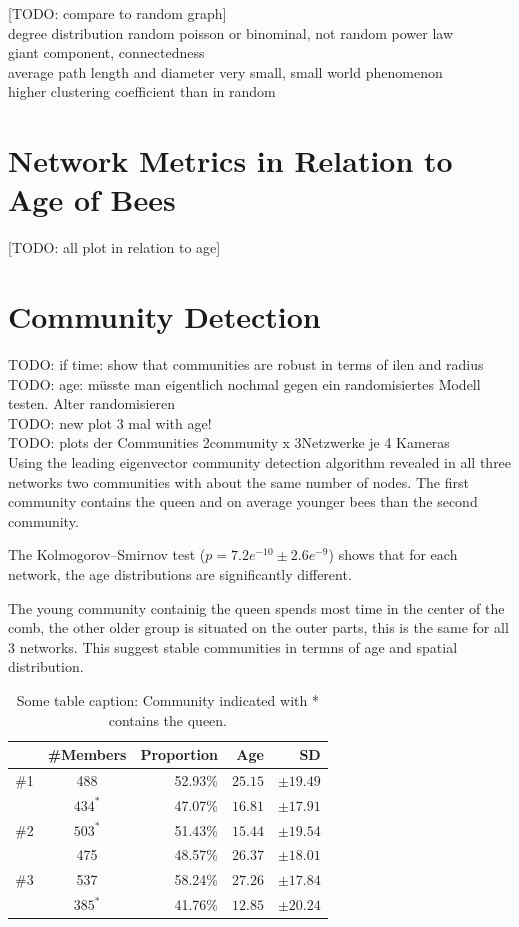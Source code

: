 [TODO: compare to random graph]\\
degree distribution random poisson or binominal, not random power law\\
giant component, connectedness\\
average path length and diameter very small, small world phenomenon\\
higher clustering coefficient than in random\\

\section{Network Metrics in Relation to Age of Bees}

[TODO: all plot in relation to age]

\section{Community Detection}

TODO: if time: show that communities are robust in terms of ilen and radius\\
TODO: age: müsste man eigentlich nochmal gegen ein randomisiertes Modell testen. Alter randomisieren\\
TODO: new plot 3 mal with age!\\
TODO: plots der Communities 2community x 3Netzwerke je 4 Kameras\\

Using the leading eigenvector community detection algorithm revealed in all three networks two communities with about the same number of nodes. The first community contains the queen and on average younger bees than the second community.

The Kolmogorov–Smirnov test ($p=7.2e^{-10} \pm2.6e^{-9}$) shows that for each network, the age distributions are significantly different.

The young community containig the queen spends most time in the center of the comb, the other older group is situated on the outer parts, this is the same for all 3 networks. This suggest stable communities in termns of age and spatial distribution.


\begin{table}
\centering
\begin{tabular}{ccrrr}
	\toprule
	{}  & \#Members & Proportion & Age & SD\\
	\midrule 
	\#1  & 488     & 52.93\% & $25.15$ & $\pm19.49$ \\
	             & $434^*$ & 47.07\% & $16.81$ & $\pm17.91$ \\
	\midrule   							
	\#2  & $503^*$ & 51.43\% & $15.44$ & $\pm19.54$ \\
	             & 475     & 48.57\% & $26.37$ & $\pm18.01$ \\
	\midrule  
	\#3  & 537     & 58.24\% & $27.26$ & $\pm17.84$ \\
	             & $385^*$ & 41.76\% & $12.85$ & $\pm20.24$ \\
	\bottomrule
\end{tabular}
\caption{Some table caption: Community indicated with * contains the queen.}
\label{tab:communities}
\end{table}


